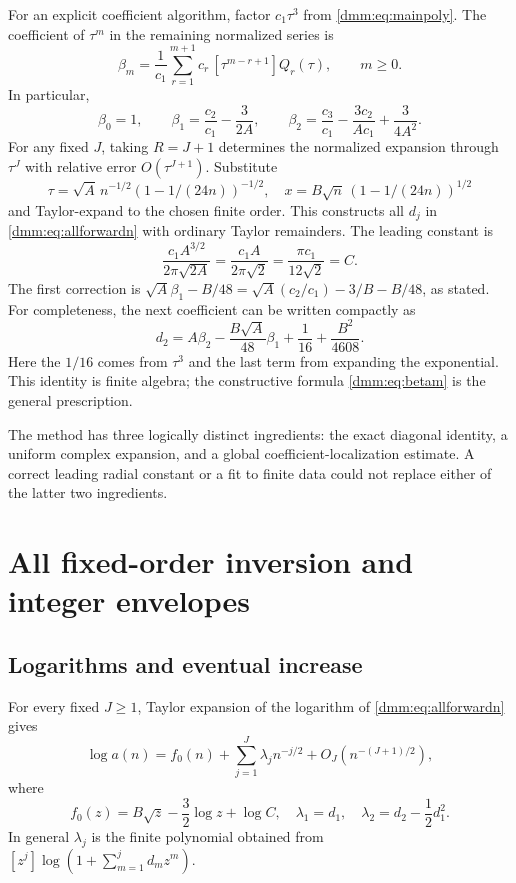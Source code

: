 \documentclass[11pt,letterpaper]{article}
\numberwithin{equation}{section}
\theoremstyle{definition}\newtheorem{definition}[theorem]{Definition}
\theoremstyle{remark}\newtheorem{remark}[theorem]{Remark}
\begin{document}
For an explicit coefficient algorithm, factor $c_1\tau^3$ from \eqref{dmm:eq:mainpoly}. The coefficient of $\tau^m$ in the remaining normalized series is
\begin{equation}\label{dmm:eq:betam}
\beta_m=\frac1{c_1}
\sum_{r=1}^{m+1}c_r\,[\tau^{m-r+1}]Q_r(\tau),
\qquad m\ge0.
\end{equation}
In particular,
\begin{equation}\label{dmm:eq:beta12}
\beta_0=1,\qquad
\beta_1=\frac{c_2}{c_1}-\frac3{2A},\qquad
\beta_2=\frac{c_3}{c_1}-\frac{3c_2}{Ac_1}+\frac3{4A^2}.
\end{equation}
For any fixed $J$, taking $R=J+1$ determines the normalized expansion through $\tau^J$ with relative error $O(\tau^{J+1})$. Substitute
\[
\tau=\sqrt A\,n^{-1/2}(1-1/(24n))^{-1/2},\quad
x=B\sqrt n\,(1-1/(24n))^{1/2}
\]
and Taylor-expand to the chosen finite order. This constructs all $d_j$ in \eqref{dmm:eq:allforwardn} with ordinary Taylor remainders. The leading constant is
\[
\frac{c_1 A^{3/2}}{2\pi\sqrt{2A}}
=\frac{c_1 A}{2\pi\sqrt2}=\frac{\pi c_1}{12\sqrt2}=C.
\]
The first correction is
$\sqrt A\beta_1-B/48=\sqrt A(c_2/c_1)-3/B-B/48$, as stated.
For completeness, the next coefficient can be written compactly as
\begin{equation}\label{dmm:eq:d2}
d_2=A\beta_2-\frac{B\sqrt A}{48}\beta_1
+\frac1{16}+\frac{B^2}{4608}.
\end{equation}
Here the $1/16$ comes from $\tau^3$ and the last term from expanding the exponential. This identity is finite algebra; the constructive formula \eqref{dmm:eq:betam} is the general prescription.

The method has three logically distinct ingredients: the exact diagonal identity, a uniform complex expansion, and a global coefficient-localization estimate. A correct leading radial constant or a fit to finite data could not replace either of the latter two ingredients.

\section{All fixed-order inversion and integer envelopes}\label{dmm:sec:inverse}
\subsection{Logarithms and eventual increase}
For every fixed $J\ge1$, Taylor expansion of the logarithm of \eqref{dmm:eq:allforwardn} gives
\begin{equation}\label{dmm:eq:logforward}
\log a(n)=f_0(n)+\sum_{j=1}^{J}\lambda_jn^{-j/2}
+O_J(n^{-(J+1)/2}),
\end{equation}
where
\begin{equation}\label{dmm:eq:f0}
f_0(z)=B\sqrt z-\frac32\log z+\log C,
\quad \lambda_1=d_1,\quad \lambda_2=d_2-\frac12d_1^2.
\end{equation}
In general $\lambda_j$ is the finite polynomial obtained from
$[z^j]\log(1+\sum_{m=1}^{j}d_mz^m)$.
\end{document}
